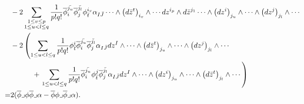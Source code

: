 \documentclass[12pt]{amsart}
\numberwithin{equation}{section}
\newcommand{\dz}{d \bar{z}}
\newcommand{\w}{\wedge}
\renewcommand{\1}{\mathds{1}}
\newcommand{\lc}{\lrcorner}
\renewcommand{\>}{\rightarrow}
\def\w{\wedge}
\begin{document}
\begin{enumerate}
$\begin{aligned}
& -2 \sum_{\begin{subarray}{c} 1 \leq v \leq p\\ 1 \leq u < l \leq q
\end{subarray}} \frac{1}{p!q!} \overline{\phi}^{\bar{j_u}}_i
\overline{\phi}^{\bar{j_l}}_j \phi^{i_v}_{\bar{t}} \alpha_{I\bar{J}}
\cdots \w \big(\dz^t\big)_{i_v} \w \cdots dz^{i_p} \w \dz^{j_1}
\cdots \w \big(dz^i\big)_{j_u} \w \cdots
\w \big(dz^j\big)_{j_l} \w \cdots \\
& -2 \left( \sum_{1 \leq u < l \leq q}
\frac{1}{p!q!} \phi^{i}_{\bar{t}} \overline{\phi}^{\bar{j_u}}_i
\overline{\phi}^{\bar{j_l}}_j \alpha_{I\bar{J}} dz^{I} \w \cdots
\w \big(\dz^t\big)_{j_u} \w \cdots \w \big(dz^j\big)_{j_l} \w \cdots \right.\\
& \quad \quad \quad + \left. \sum_{1 \leq u < l \leq q}
\frac{1}{p!q!} \overline{\phi}^{\bar{j_u}}_i \phi^{j}_{\bar{t}}
\overline{\phi}^{\bar{j_l}}_j \alpha_{I\bar{J}} dz^{I} \w \cdots \w
\big( dz^i \big)_{j_u} \w
\cdots \w \big( \dz^t \big)_{j_l} \w \cdots \right) \\
=& 2 ( \overline{\phi} \lc \phi \overline{\phi} \lc \alpha
- \overline{\phi} \phi \lc \overline{\phi} \lc \alpha ). \\
\end{aligned}$
\end{enumerate}
\end{document}

